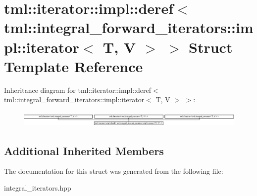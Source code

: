 \hypertarget{structtml_1_1iterator_1_1impl_1_1deref_3_01tml_1_1integral__forward__iterators_1_1impl_1_1iterator_3_01T_00_01V_01_4_01_4}{\section{tml\+:\+:iterator\+:\+:impl\+:\+:deref$<$ tml\+:\+:integral\+\_\+forward\+\_\+iterators\+:\+:impl\+:\+:iterator$<$ T, V $>$ $>$ Struct Template Reference}
\label{structtml_1_1iterator_1_1impl_1_1deref_3_01tml_1_1integral__forward__iterators_1_1impl_1_1iterator_3_01T_00_01V_01_4_01_4}
}
Inheritance diagram for tml\+:\+:iterator\+:\+:impl\+:\+:deref$<$ tml\+:\+:integral\+\_\+forward\+\_\+iterators\+:\+:impl\+:\+:iterator$<$ T, V $>$ $>$\+:\begin{figure}[H]
\begin{center}
\leavevmode
\includegraphics[height=0.813362cm]{structtml_1_1iterator_1_1impl_1_1deref_3_01tml_1_1integral__forward__iterators_1_1impl_1_1iterator_3_01T_00_01V_01_4_01_4}
\end{center}
\end{figure}
\subsection*{Additional Inherited Members}


The documentation for this struct was generated from the following file\+:\begin{DoxyCompactItemize}
\item 
integral\+\_\+iterators.\+hpp\end{DoxyCompactItemize}
